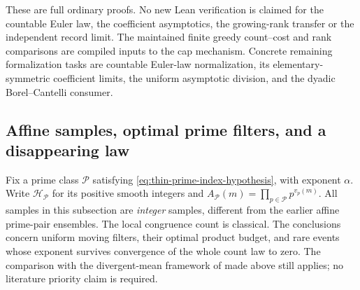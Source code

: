 \documentclass[11pt]{article}
\theoremstyle{definition}
\begin{document}
These are full ordinary proofs.  No new Lean verification
is claimed for the countable Euler law, the coefficient
asymptotics, the growing-rank transfer or the independent
record limit.
The maintained finite greedy count--cost and rank
comparisons are compiled inputs to the cap mechanism.
Concrete remaining formalization tasks are countable
Euler-law normalization, its elementary-symmetric
coefficient limits, the uniform asymptotic division, and
the dyadic Borel--Cantelli consumer.

\subsection{Affine samples, optimal prime filters, and a disappearing law}
\label{sec:affine-thin-prime-filters}

Fix a prime class $\mathcal P$ satisfying
\eqref{eq:thin-prime-index-hypothesis}, with exponent $\alpha$.
Write $\mathcal H_{\mathcal P}$ for its positive smooth integers and
$A_{\mathcal P}(m)=\prod_{p\in\mathcal P}p^{v_p(m)}$.
All samples in this subsection are \emph{integer} samples, different
from the earlier affine prime-pair ensembles.  The local congruence
count is classical.  The conclusions concern uniform moving filters,
their optimal product budget, and rare events whose exponent survives
convergence of the whole count law to zero.
The comparison with the divergent-mean framework of \cite{KN} made
above still applies; no literature priority claim is required.
\end{document}

